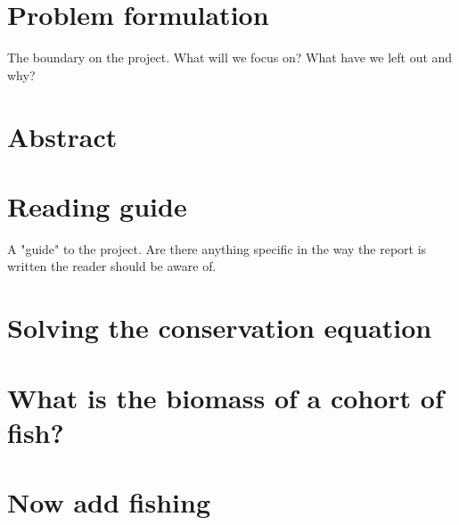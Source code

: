 \documentclass{article}
\begin{document}
\section*{Problem formulation}
The boundary on the project. What will we focus on? What have we left out and why?
\newpage
\section*{Abstract}
\newpage
\section*{Reading guide}
A "guide" to the project. Are there anything specific in the way the report is written the reader should be aware of.
\newpage


\cleardoublepage
%

\tableofcontents 
\thispagestyle{empty} %
\cleardoublepage
\setcounter{page}{1}
%


\section{Solving the conservation equation}\label{sec:Ex1}
\subsection{}\label{sec:Ex1A}

\newpage



\section{What is the biomass of a cohort of fish?}\label{sec:Ex2}
\subsection{}\label{sec:Ex2A}

\newpage



\section{Now add fishing}\label{sec:Ex3}
\end{document}
